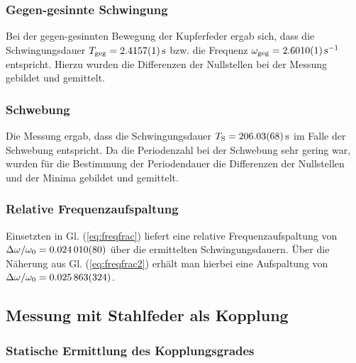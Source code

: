 \documentclass[11pt,a4paper,titlepage, ngerman]{article}
\newcommand{\refeq}[1]{Gl. (\ref{eq:#1})}
\begin{document}
			\subsubsection{Gegen-gesinnte Schwingung}
				
				Bei der gegen-gesinnten Bewegung der Kupferfeder ergab sich, dass die Schwingungsdauer $T_\text{geg} = \SI{2,4157 +- 0,0001}{\second}$ bzw. die Frequenz $\omega_\text{geg}  = \SI{2,6010 +- 0,0001}{\s^{-1}}$ entspricht. Hierzu wurden die Differenzen der Nullstellen bei der Messung gebildet und gemittelt. 
				
			\subsubsection{Schwebung}
				
				Die Messung ergab, dass die Schwingungsdauer $T_\text{S} = \SI{206,03 +-0,68}{\second}$ im Falle der Schwebung entspricht. Da die Periodenzahl bei der Schwebung sehr gering war, wurden für die Bestimmung der Periodendauer die Differenzen der Nullstellen und der Minima gebildet und gemittelt.

			\subsubsection{Relative Frequenzaufspaltung}
				
				Einsetzten in \refeq{freqfrac} liefert eine relative Frequenzaufspaltung von $\Delta\omega / \omega_0 = \SI{0,024010 +- 0,000080}{}$ über die ermittelten Schwingungsdauern. Über die Näherung aus \refeq{freqfrac2} erhält man hierbei eine Aufspaltung von $\Delta\omega / \omega_0 = \SI{0,025863 +- 0,000324}{}$.
				
		\subsection{Messung mit Stahlfeder als Kopplung}	
					
			\subsubsection{Statische Ermittlung des Kopplungsgrades}							
			
\end{document}
